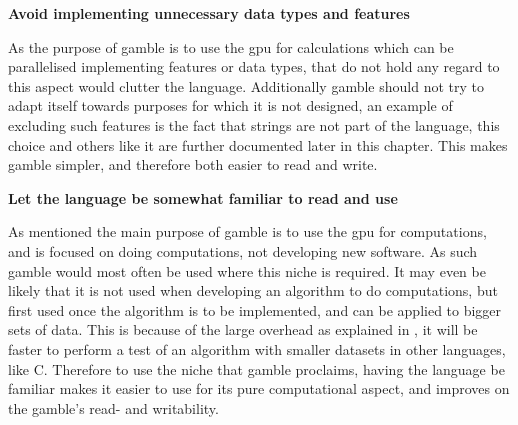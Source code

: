 \textbf{Avoid implementing unnecessary data types and features}

As the purpose of \gls{gamble} is to use the \acrshort{gpu} for calculations which can be parallelised implementing features or data types, that do not hold any regard to this aspect would clutter the language.
Additionally \gls{gamble} should not try to adapt itself towards purposes for which it is not designed, an example of excluding such features is the fact that strings are not part of the language, this choice and others like it are further documented later in this chapter.
This makes \gls{gamble} simpler, and therefore both easier to read and write.

\textbf{Let the language be somewhat familiar to read and use}

As mentioned the main purpose of \gls{gamble} is to use the \acrshort{gpu} for computations, and is focused on doing computations, not developing new software.
As such \gls{gamble} would most often be used where this niche is required.
It may even be likely that it is not used when developing an algorithm to do computations, but first used once the algorithm is to be implemented, and can be applied to bigger sets of data.\citep{AlgorithmDesign}
This is because of the large overhead as explained in , it will be faster to perform a test of an algorithm with smaller datasets in other languages, like C.
Therefore to use the niche that \gls{gamble} proclaims, having the language be familiar makes it easier to use for its pure computational aspect, and improves on the \gls{gamble}'s read- and writability.